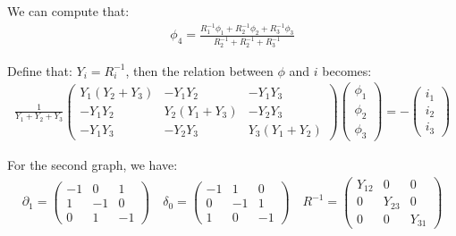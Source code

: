 \documentclass[]{ctexart}
\begin{document}
		We can compute that:
			\begin{equation*}
			\begin{aligned}
				\phi_4=\frac{R_{1}^{-1} \phi_{1}+R_{2}^{-1} \phi_{2}+R_{3}^{-1} \phi_{3}}{R_{2}^{-1}+R_{2}^{-1}+R_{3}^{-1}}
			\end{aligned}
			\end{equation*}
			
		Define that: $Y_i=R_i^{-1}$, then the relation between $\phi$ and $i$ becomes:
			\begin{equation*}
			\begin{aligned}
				\frac{1}{Y_{1}+Y_{2}+Y_{3}}\left(\begin{array}{ccc}
				Y_{1}\left(Y_{2}+Y_{3}\right) & -Y_{1} Y_{2} & -Y_{1} Y_{3} \\
				-Y_{1} Y_{2} & Y_{2}\left(Y_{1}+Y_{3}\right) & -Y_{2} Y_{3} \\
				-Y_{1} Y_{3} & -Y_{2} Y_{3} & Y_{3}\left(Y_{1}+Y_{2}\right)
				\end{array}\right)\left(\begin{array}{l}
				\phi_{1} \\
				\phi_{2} \\
				\phi_{3}
				\end{array}\right)=-\left(\begin{array}{c}
				i_{1} \\
				i_{2} \\
				i_{3}
				\end{array}\right)
			\end{aligned}
			\end{equation*}
			
		For the second graph, we have:
			\begin{equation*}
			\begin{aligned}
				\partial_{1}=\left(\begin{array}{ccc}
				-1 & 0 & 1 \\
				1 & -1 & 0 \\
				0 & 1 & -1
				\end{array}\right) \quad \delta_{0}=\left(\begin{array}{ccc}
				-1 & 1 & 0 \\
				0 & -1 & 1 \\
				1 & 0 & -1
				\end{array}\right) \quad R^{-1}=\left(\begin{array}{ccc}
				Y_{12} & 0 & 0 \\
				0 & Y_{23} & 0 \\
				0 & 0 & Y_{31}
				\end{array}\right)
			\end{aligned}
			\end{equation*}
			
\end{document}

